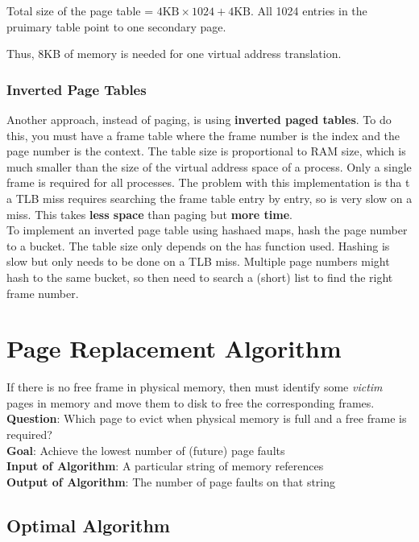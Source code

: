 \documentclass{article}
\newcommand{\bold}[1]{\textbf{#1}}
\begin{document}
Total size of the page table = $4\textrm{KB} \times 1024 + 4\textrm{KB}$. All 1024 entries in the pruimary table point to one secondary page. 

Thus, 8KB of memory is needed for one virtual address translation. 

\subsubsection{Inverted Page Tables}

Another approach, instead of paging, is using \bold{inverted paged tables}. To do this, you must have a frame table where the frame number is the index and the page number is the context. The table size is proportional to RAM size, which is much smaller than the size of the virtual address space of a process. Only a single frame is required for all processes. The problem with this implementation is tha t a TLB miss requires searching the frame table entry by entry, so is very slow on a miss. This takes \bold{less space} than paging but \bold{more time}. \\ 

To implement an inverted page table using hashaed maps, hash the page number to a bucket. The table size only depends on the has function used. Hashing is slow but only needs to be done on a TLB miss. Multiple page numbers might hash to the same bucket, so then need to search a (short) list to find the right frame number. 

\newpage
\section{Page Replacement Algorithm}

If there is no free frame in physical memory, then must identify some \emph{victim} pages in memory and move them to disk to free the corresponding frames. \\

\bold{Question}: Which page to evict when physical memory is full and a free frame is required? \\
\bold{Goal}: Achieve the lowest number of (future) page faults \\ 
\bold{Input of Algorithm}: A particular string of memory references \\ 
\bold{Output of Algorithm}: The number of page faults on that string \\ 

\subsection{Optimal Algorithm}
\end{document}

